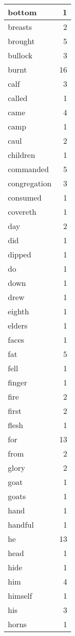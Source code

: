 \begin{center}
\begin{longtable}{l|r}
bottom & 1 \\ \hline
breasts & 2 \\ \hline
brought & 5 \\ \hline
bullock & 3 \\ \hline
burnt & 16 \\ \hline
calf & 3 \\ \hline
called & 1 \\ \hline
came & 4 \\ \hline
camp & 1 \\ \hline
caul & 2 \\ \hline
children & 1 \\ \hline
commanded & 5 \\ \hline
congregation & 3 \\ \hline
consumed & 1 \\ \hline
covereth & 1 \\ \hline
day & 2 \\ \hline
did & 1 \\ \hline
dipped & 1 \\ \hline
do & 1 \\ \hline
down & 1 \\ \hline
drew & 1 \\ \hline
eighth & 1 \\ \hline
elders & 1 \\ \hline
faces & 1 \\ \hline
fat & 5 \\ \hline
fell & 1 \\ \hline
finger & 1 \\ \hline
fire & 2 \\ \hline
first & 2 \\ \hline
flesh & 1 \\ \hline
for & 13 \\ \hline
from & 2 \\ \hline
glory & 2 \\ \hline
goat & 1 \\ \hline
goats & 1 \\ \hline
hand & 1 \\ \hline
handful & 1 \\ \hline
he & 13 \\ \hline
head & 1 \\ \hline
hide & 1 \\ \hline
him & 4 \\ \hline
himself & 1 \\ \hline
his & 3 \\ \hline
horns & 1 \\ \hline

\end{longtable}
\end{center}
